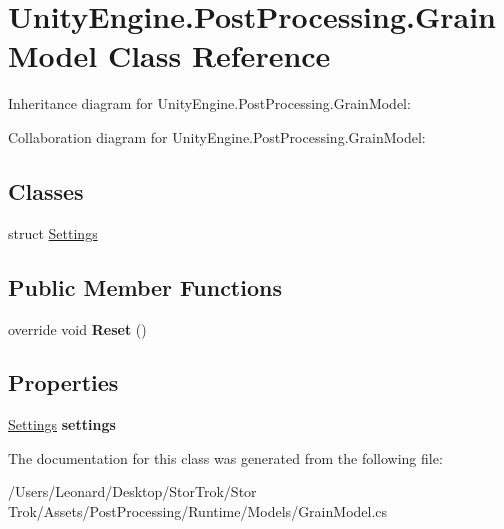 \hypertarget{class_unity_engine_1_1_post_processing_1_1_grain_model}{}\section{Unity\+Engine.\+Post\+Processing.\+Grain\+Model Class Reference}
\label{class_unity_engine_1_1_post_processing_1_1_grain_model}


Inheritance diagram for Unity\+Engine.\+Post\+Processing.\+Grain\+Model\+:


Collaboration diagram for Unity\+Engine.\+Post\+Processing.\+Grain\+Model\+:
\subsection*{Classes}
\begin{DoxyCompactItemize}
\item 
struct \hyperlink{struct_unity_engine_1_1_post_processing_1_1_grain_model_1_1_settings}{Settings}
\end{DoxyCompactItemize}
\subsection*{Public Member Functions}
\begin{DoxyCompactItemize}
\item 
\mbox{\label{class_unity_engine_1_1_post_processing_1_1_grain_model_ab4dbacfe4c524d5e483285e361897d30}} 
override void {\bfseries Reset} ()
\end{DoxyCompactItemize}
\subsection*{Properties}
\begin{DoxyCompactItemize}
\item 
\mbox{\label{class_unity_engine_1_1_post_processing_1_1_grain_model_afbb518425ab6874c1578abf45f5bd1fb}} 
\hyperlink{struct_unity_engine_1_1_post_processing_1_1_grain_model_1_1_settings}{Settings} {\bfseries settings}
\end{DoxyCompactItemize}


The documentation for this class was generated from the following file\+:\begin{DoxyCompactItemize}
\item 
/\+Users/\+Leonard/\+Desktop/\+Stor\+Trok/\+Stor Trok/\+Assets/\+Post\+Processing/\+Runtime/\+Models/Grain\+Model.\+cs\end{DoxyCompactItemize}
